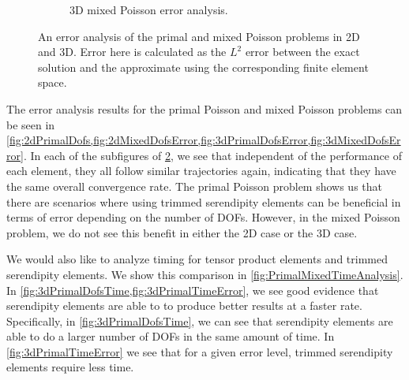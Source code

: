 \documentclass[format=acmsmall,screen,timestamp=false,a4paper]{acmart}
\newcommand\lm[1]{\textbf{\textcolor[rgb]{1,0,0.5}{[Lawrence: #1]}}}
\begin{document}
\begin{figure}[htbp]
\begin{subfigure}[h]{0.48\textwidth}
      \caption{3D mixed Poisson error analysis. \label{fig:3dMixedDofsError}}
  \end{subfigure}
  \caption{An error analysis of the primal and mixed Poisson problems in 2D and 3D.  Error here is calculated as the $L^2$ error between the exact solution and the approximate using the corresponding finite element space.}
\label{fig:PrimalMixedErrorAnalysis}
\end{figure}


The error analysis results for the primal Poisson and mixed Poisson problems can be seen in \cref{fig:2dPrimalDofs,fig:2dMixedDofsError,fig:3dPrimalDofsError,fig:3dMixedDofsError}.  In each of the subfigures of \cref{fig:PrimalMixedErrorAnalysis}, we see that independent of the performance of each element, they all follow similar trajectories again, indicating that they have the same overall convergence rate.  The primal Poisson problem shows us that there are scenarios where using trimmed serendipity elements can be beneficial in terms of error depending on the number of DOFs.  However, in the mixed Poisson problem, we do not see this benefit in either the 2D case or the 3D case.  

We would also like to analyze timing for tensor product elements and trimmed serendipity elements.  We show this comparison in \cref{fig:PrimalMixedTimeAnalysis}.  In \cref{fig:3dPrimalDofsTime,fig:3dPrimalTimeError}, we see good evidence that serendipity elements are able to to produce better results at a faster rate.  Specifically, in \cref{fig:3dPrimalDofsTime}, we can see that serendipity elements are able to do a larger number of DOFs in the same amount of time.  In \cref{fig:3dPrimalTimeError} we see that for a given error level, trimmed serendipity elements require less time. %
\end{document}

